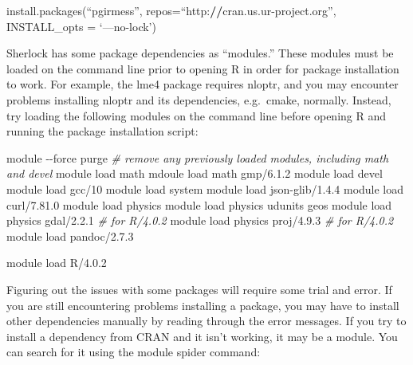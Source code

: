 \documentclass[
]{book}
\newenvironment{Shaded}{\begin{snugshade}}{\end{snugshade}}
\newcommand{\AttributeTok}[1]{\textcolor[rgb]{0.77,0.63,0.00}{#1}}
\newcommand{\CommentTok}[1]{\textcolor[rgb]{0.56,0.35,0.01}{\textit{#1}}}
\newcommand{\ErrorTok}[1]{\textcolor[rgb]{0.64,0.00,0.00}{\textbf{#1}}}
\newcommand{\ExtensionTok}[1]{#1}
\newcommand{\FunctionTok}[1]{\textcolor[rgb]{0.00,0.00,0.00}{#1}}
\newcommand{\NormalTok}[1]{#1}
\newcommand{\SpecialCharTok}[1]{\textcolor[rgb]{0.00,0.00,0.00}{#1}}
\begin{document}
\begin{Shaded}
\begin{Highlighting}[]
\FunctionTok{install.packages}\NormalTok{(“pgirmess”, }\AttributeTok{repos=}\NormalTok{“http}\SpecialCharTok{:}\ErrorTok{//}\NormalTok{cran.us.ur}\SpecialCharTok{{-}}\NormalTok{project.org”, }
                  \AttributeTok{INSTALL\_opts =}\NormalTok{ ‘—no}\SpecialCharTok{{-}}\NormalTok{lock’)}
\end{Highlighting}
\end{Shaded}

Sherlock has some package dependencies as ``modules.'' These modules must be loaded on the command line prior to opening R in order for package installation to work. For example, the lme4 package requires nloptr, and you may encounter problems installing nloptr and its dependencies, e.g.~cmake, normally. Instead, try loading the following modules on the command line before opening R and running the package installation script:

\begin{Shaded}
\begin{Highlighting}[]
\ExtensionTok{module} \AttributeTok{{-}{-}force}\NormalTok{ purge }\CommentTok{\# remove any previously loaded modules, including math and devel}
\ExtensionTok{module}\NormalTok{ load math}
\ExtensionTok{mdoule}\NormalTok{ load math gmp/6.1.2}
\ExtensionTok{module}\NormalTok{ load devel}
\ExtensionTok{module}\NormalTok{ load gcc/10}
\ExtensionTok{module}\NormalTok{ load system}
\ExtensionTok{module}\NormalTok{ load json{-}glib/1.4.4}
\ExtensionTok{module}\NormalTok{ load curl/7.81.0}
\ExtensionTok{module}\NormalTok{ load physics}
\ExtensionTok{module}\NormalTok{ load physics udunits geos}
\ExtensionTok{module}\NormalTok{ load physics gdal/2.2.1 }\CommentTok{\# for R/4.0.2}
\ExtensionTok{module}\NormalTok{ load physics proj/4.9.3 }\CommentTok{\# for R/4.0.2}
\ExtensionTok{module}\NormalTok{ load pandoc/2.7.3}

\ExtensionTok{module}\NormalTok{ load R/4.0.2}
\end{Highlighting}
\end{Shaded}

Figuring out the issues with some packages will require some trial and error. If you are still encountering problems installing a package, you may have to install other dependencies manually by reading through the error messages. If you try to install a dependency from CRAN and it isn't working, it may be a module. You can search for it using the module spider command:
\end{document}
